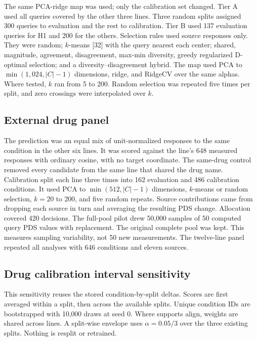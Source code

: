 \documentclass[12pt]{article}
\begin{document}
The same PCA-ridge map was used; only the calibration set changed. Tier A used all queries covered by the other three lines. Three random splits assigned 300 queries to evaluation and the rest to calibration. Tier B used 137 evaluation queries for H1 and 200 for the others. Selection rules used source responses only. They were random; $k$-means [32] with the query nearest each center; shared, magnitude, agreement, disagreement, max-min diversity, greedy regularized D-optimal selection; and a diversity--disagreement hybrid. The map used PCA to $\min(1{,}024, |C| - 1)$ dimensions, ridge, and RidgeCV over the same alphas. Where tested, $k$ ran from 5 to 200. Random selection was repeated five times per split, and zero crossings were interpolated over $k$.

\subsection*{External drug panel}

The prediction was an equal mix of unit-normalized responses to the same condition in the other six lines. It was scored against the line's 648 measured responses with ordinary cosine, with no target coordinate. The same-drug control removed every candidate from the same line that shared the drug name. Calibration split each line three times into 162 evaluation and 486 calibration conditions. It used PCA to $\min(512, |C| - 1)$ dimensions, $k$-means or random selection, $k = 20$ to 200, and five random repeats. Source contributions came from dropping each source in turn and averaging the resulting PDS change. Allocation covered 420 decisions. The full-pool pilot drew 50,000 samples of 50 computed query PDS values with replacement. The original complete pool was kept. This measures sampling variability, not 50 new measurements. The twelve-line panel repeated all analyses with 646 conditions and eleven sources.

\subsection*{Drug calibration interval sensitivity}

This sensitivity reuses the stored condition-by-split deltas. Scores are first averaged within a split, then across the available splits. Unique condition IDs are bootstrapped with 10,000 draws at seed 0. Where supports align, weights are shared across lines. A split-wise envelope uses $\alpha = 0.05/3$ over the three existing splits. Nothing is resplit or retrained.
\end{document}
